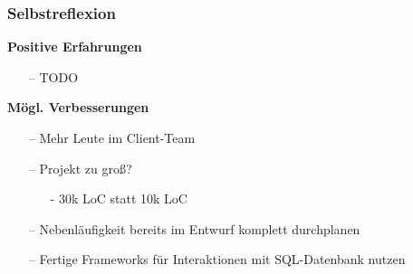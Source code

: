 \documentclass[aspectratio=1610]{beamer}
\begin{document}
	\begin{frame}[plain]
        \frametitle{\textbf{Selbstreflexion}}
        \begin{minipage}{0.5\textwidth}
            \textbf{Positive Erfahrungen}
            \begin{itemize}
                \item[--] TODO %
            \end{itemize}
        \end{minipage}%
        \begin{minipage}{0.5\textwidth}
            \textbf{Mögl. Verbesserungen}
            \begin{itemize}
                \item[--] Mehr Leute im Client-Team
                \item[--] Projekt zu groß?
                    \begin{itemize}
                        \item[-] 30k LoC statt 10k LoC
                    \end{itemize}
                \item[--] Nebenläufigkeit bereits im Entwurf komplett
                    durchplanen
                \item[--] Fertige Frameworks für Interaktionen mit
                    SQL-Datenbank nutzen
            \end{itemize}
        \end{minipage}
    \end{frame}
\end{document}
